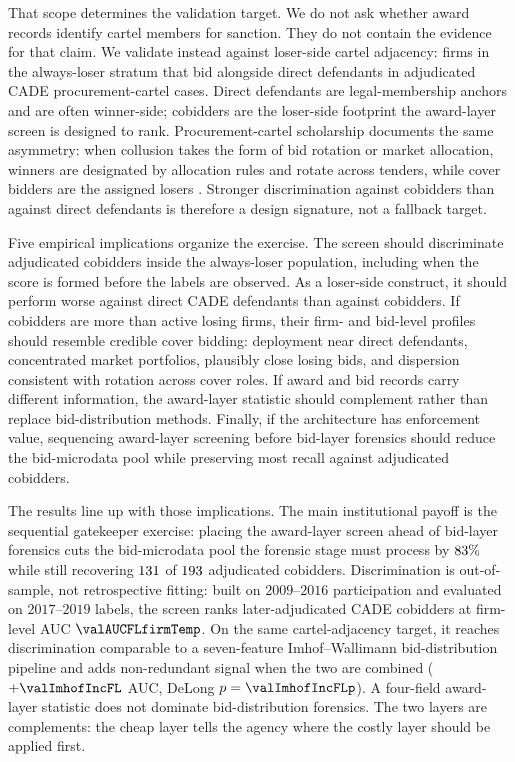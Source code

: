 That scope determines the validation target. We do not ask
whether award records identify cartel members for sanction. They
do not contain the evidence for that claim. We validate instead
against loser-side cartel adjacency: firms in the always-loser
stratum that bid alongside direct defendants in adjudicated
CADE procurement-cartel cases. Direct defendants are
legal-membership anchors and are often winner-side; cobidders
are the loser-side footprint the award-layer screen is designed
to rank. Procurement-cartel scholarship documents the same
asymmetry: when collusion takes the form of bid rotation or
market allocation, winners are designated by allocation rules
and rotate across tenders, while cover bidders are the assigned
losers \citep{marshall2012economics,kawai2022detecting}.
Stronger discrimination against cobidders than against direct
defendants is therefore a design signature, not a fallback
target.

Five empirical implications organize the exercise. The screen
should discriminate adjudicated cobidders inside the
always-loser population, including when the score is formed
before the labels are observed. As a loser-side construct, it
should perform worse against direct CADE defendants than against
cobidders. If cobidders are more than active losing firms, their
firm- and bid-level profiles should resemble credible cover
bidding: deployment near direct defendants, concentrated market
portfolios, plausibly close losing bids, and dispersion
consistent with rotation across cover roles. If award and bid
records carry different information, the award-layer statistic
should complement rather than replace bid-distribution methods.
Finally, if the architecture has enforcement value, sequencing
award-layer screening before bid-layer forensics should reduce
the bid-microdata pool while preserving most recall against
adjudicated cobidders.

The results line up with those implications. The main
institutional payoff is the sequential gatekeeper exercise:
placing the award-layer screen ahead of bid-layer forensics cuts
the bid-microdata pool the forensic stage must process by
$83\%$ while still recovering
$131$ of $193$ adjudicated cobidders.
Discrimination is out-of-sample, not retrospective fitting:
built on $2009$--$2016$ participation and evaluated on
$2017$--$2019$ labels, the screen ranks later-adjudicated CADE
cobidders at firm-level AUC $\valAUCFLfirmTemp$. On the same
cartel-adjacency target, it reaches discrimination comparable to
a seven-feature Imhof--Wallimann bid-distribution pipeline and
adds non-redundant signal when the two are combined
($+\valImhofIncFL$ AUC, DeLong $p=\valImhofIncFLp$). A four-field
award-layer statistic does not dominate bid-distribution
forensics. The two layers are complements: the cheap layer tells
the agency where the costly layer should be applied first.

